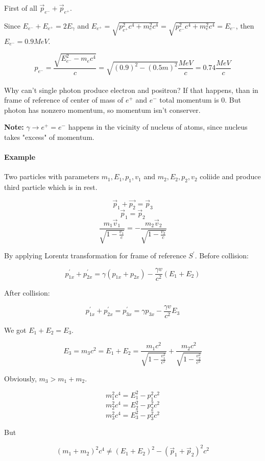First of all $\vec{p}_{e^-} + \vec{p}_{e^+}$.

Since $E_{e^-} + E_{e^+} = 2E_\gamma$ and $E_{e^+} = \sqrt{p_{e^+}^2c^4+m_e^2c^4} = \sqrt{p_{e^-}^2c^4+m_e^2c^4} = E_{e^-}$, then $E_{e^-} = 0.9MeV$.

$$p_{e^-} = \frac{\sqrt{E_{e^-}^2 - m_{e}c^4}}{c} = \sqrt{(0.9)^2-(0.5m)^2}\frac{MeV}{c} = 0.74 \frac{MeV}{c}$$
	
	\paragraph{}
	Why can't single photon produce electron and positron? If that happens, than in frame of reference of center of mass of $e^+$ and $e^-$ total momentum is 0. But photon has nonzero momentum, so momentum isn't conserver.
	
	\textbf{Note:} $\gamma \to e^+ = e^-$ happens in the vicinity of nucleus of atoms, since nucleus takes "excess" of momentum.
	
	\paragraph{Example} Two particles with parameters $m_1, E_1, p_1, v_1$ and $m_2, E_2, p_2, v_2$ coliide and produce third particle which is in rest.
	
	$$\vec{p}_1 + \vec{p_2} = \vec{p}_3$$
	$$\vec{p}_1=\vec{p}_2$$
	$$\frac{m_1\vec{v}_1}{\sqrt{1-\frac{v_1}{c}}} = -\frac{m_2\vec{v}_2}{\sqrt{1-\frac{v_2}{c}}}$$
	
	By applying Lorentz transformation for frame of reference $S^\prime$. Before collision:
	
	$$p^\prime_{1x} + p^\prime_{2x} = \gamma \left( p_{1x} + p_{2x} \right) - \frac{\gamma v}{c^2}\left(E_1+E_2\right)$$
	
	After collision:
	
	$$p^\prime_{1x} + p^\prime_{2x} =  p_{3x}^\prime = \gamma p_{3x} - \frac{\gamma v}{c^2}E_3$$
	
	We got $E_1+E_2 = E_3$.
	
	$$E_3  = m_3c^2 = E_1+E_2  = \frac{m_1c^2}{\sqrt{1-\frac{v_1^2}{c^2}}}+\frac{m_2c^2}{\sqrt{1-\frac{v_2^2}{c^2}}}$$
	
	Obviously, $m_3 > m_1+m_2$.
	
	$$m_1^2c^4 = E_1^2-p_1^2c^2$$
	$$m_2^2c^4 = E_2^2-p_2^2c^2$$
	$$m_3^2c^4 = E_3^2-p_3^2c^2$$
	
	But
	
	$$\left(m_1+m_2\right)^2c^4 \neq (E_1+E_2)^2 - (\vec{p}_1 + \vec{p}_2)^2c^2$$